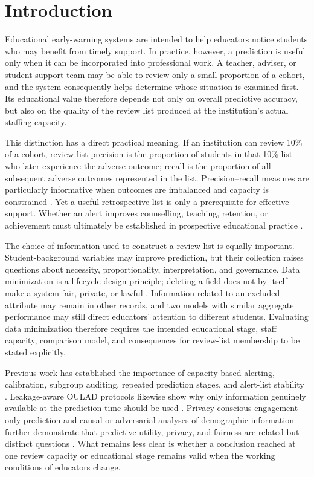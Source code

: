 \documentclass[education,article,submit,moreauthors]{Definitions/mdpi}
\begin{document}
\section{Introduction}

Educational early-warning systems are intended to help educators notice students who may benefit from timely support. In practice, however, a prediction is useful only when it can be incorporated into professional work. A teacher, adviser, or student-support team may be able to review only a small proportion of a cohort, and the system consequently helps determine whose situation is examined first. Its educational value therefore depends not only on overall predictive accuracy, but also on the quality of the review list produced at the institution's actual staffing capacity.

This distinction has a direct practical meaning. If an institution can review 10\% of a cohort, review-list precision is the proportion of students in that 10\% list who later experience the adverse outcome; recall is the proportion of all subsequent adverse outcomes represented in the list. Precision--recall measures are particularly informative when outcomes are imbalanced and capacity is constrained \citep{saito2015precision}. Yet a useful retrospective list is only a prerequisite for effective support. Whether an alert improves counselling, teaching, retention, or achievement must ultimately be established in prospective educational practice \citep{plak2022early}.

The choice of information used to construct a review list is equally important. Student-background variables may improve prediction, but their collection raises questions about necessity, proportionality, interpretation, and governance. Data minimization is a lifecycle design principle; deleting a field does not by itself make a system fair, private, or lawful \citep{gdpr2016,drachsler2016delicate,rets2023six}. Information related to an excluded attribute may remain in other records, and two models with similar aggregate performance may still direct educators' attention to different students. Evaluating data minimization therefore requires the intended educational stage, staff capacity, comparison model, and consequences for review-list membership to be stated explicitly.

Previous work has established the importance of capacity-based alerting, calibration, subgroup auditing, repeated prediction stages, and alert-list stability \citep{wu2026calibrated,wuluo2026zenodo}. Leakage-aware OULAD protocols likewise show why only information genuinely available at the prediction time should be used \citep{le2026leap}. Privacy-conscious engagement-only prediction and causal or adversarial analyses of demographic information further demonstrate that predictive utility, privacy, and fairness are related but distinct questions \citep{chiu2026privacy,hasan2022utility}. What remains less clear is whether a conclusion reached at one review capacity or educational stage remains valid when the working conditions of educators change.
\end{document}
